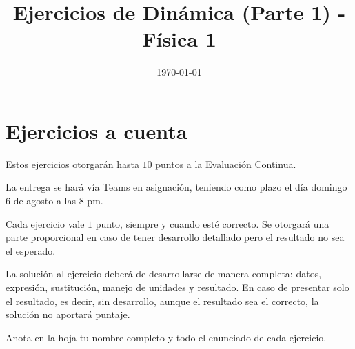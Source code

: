 \documentclass[14pt]{extarticle}
\title{\vspace*{-2cm} Ejercicios de Dinámica (Parte 1) - Física 1\vspace{-5ex}}
\date{\today}
\begin{document}
\maketitle

\section{Ejercicios a cuenta}

Estos ejercicios otorgarán hasta $10$ puntos a la Evaluación Continua.

La entrega se hará vía Teams en asignación, teniendo como plazo el día domingo 6 de agosto a las 8 pm.

Cada ejercicio vale $1$ punto, siempre y cuando esté correcto. Se otorgará una parte proporcional en caso de tener desarrollo detallado pero el resultado no sea el esperado.

La solución al ejercicio deberá de desarrollarse de manera completa: datos, expresión, sustitución, manejo de unidades y resultado. En caso de presentar solo el resultado, es decir, sin desarrollo, aunque el resultado sea el correcto, la solución no aportará puntaje.

Anota en la hoja tu nombre completo y todo el enunciado de cada ejercicio.
\end{document}
